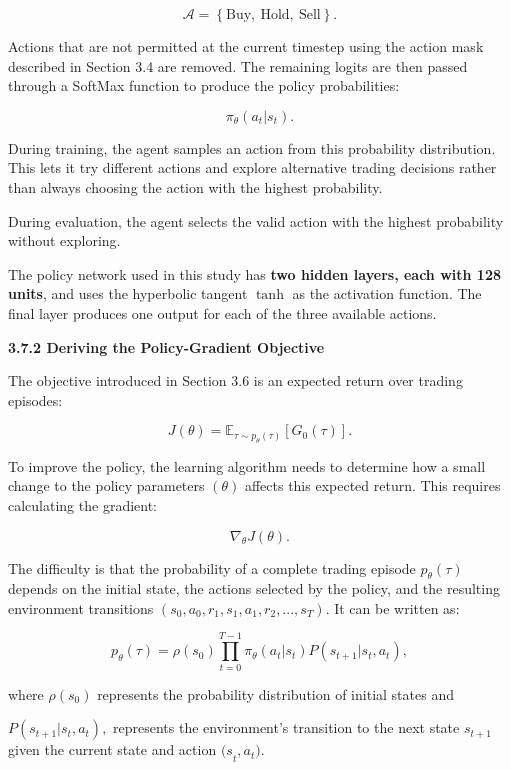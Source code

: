 \[\mathcal{A} = \left\{ \text{Buy},\ \text{Hold},\ \text{Sell} \right\}.\]

Actions that are not permitted at the current timestep using the action
mask described in Section 3.4 are removed. The remaining logits are then
passed through a SoftMax function to produce the policy probabilities:

\[\pi_{\theta}\left( a_{t}|s_{t} \right).\]

During training, the agent samples an action from this probability
distribution. This lets it try different actions and explore alternative
trading decisions rather than always choosing the action with the
highest probability.

During evaluation, the agent selects the valid action with the highest
probability without exploring.

The policy network used in this study has \textbf{two hidden layers,
each with 128 units}, and uses the hyperbolic tangent \(\tanh\) as the
activation function. The final layer produces one output for each of the
three available actions.

\textbf{3.7.2 Deriving the Policy-Gradient Objective}

The objective introduced in Section 3.6 is an expected return over
trading episodes:

\[J(\theta) = \mathbb{E}_{\tau \sim p_{\theta}(\tau)}\left\lbrack G_{0}(\tau) \right\rbrack.\]

To improve the policy, the learning algorithm needs to determine how a
small change to the policy parameters \((\theta)\) affects this expected
return. This requires calculating the gradient:

\[\nabla_{\theta}J(\theta).\]

The difficulty is that the probability of a complete trading episode
\(p_{\theta}(\tau)\) depends on the initial state, the actions selected
by the policy, and the resulting environment transitions
\(\left( s_{0},a_{0},r_{1},s_{1},a_{1},r_{2},...,s_{T} \right)\). It can
be written as:

\[p_{\theta}(\tau) = \rho\left( s_{0} \right)\prod_{t = 0}^{T - 1}\pi_{\theta}\left( a_{t}|s_{t} \right)P\left( s_{t + 1}|s_{t},a_{t} \right),\]

where \(\rho\left( s_{0} \right)\) represents the probability
distribution of initial states and

\(P\left( s_{t + 1}|s_{t},a_{t} \right),\) represents the environment's
transition to the next state \(s_{t + 1}\) given the current state and
action \({(s}_{t},a_{t})\).

